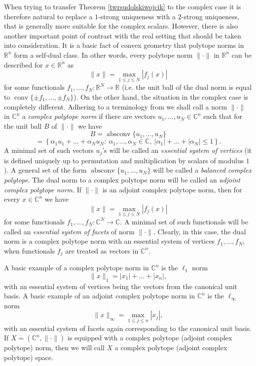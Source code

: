 \documentclass[12pt, reqno]{amsart}
\theoremstyle{definition}
\theoremstyle{remark}
\numberwithin{equation}{section}
\DeclareMathOperator{\conv}{conv}
\DeclareMathOperator{\absconv}{absconv}
\begin{document}
When trying to transfer Theorem \ref{twrsudolskiwojcik} to the complex case it is therefore natural to replace a $1$-strong uniqueness with a $2$-strong uniqueness, that is generally more suitable for the complex scalars. However, there is also another important point of contrast with the real setting that should be taken into consideration. It is a basic fact of convex geometry that polytope norms in $\mathbb{R}^n$ form a self-dual class. In other words, every polytope norm $\| \cdot \|$ in $\mathbb{R}^n$ can be described for $x \in \mathbb{R}^n$ as
$$\|x\| = \max_{1 \leq j \leq N} |f_j(x)|$$
for some functionals $f_1, \ldots, f_N: \mathbb{R}^N \to \mathbb{R}$ (i.e. the unit ball of the dual norm is equal to $\conv \{\pm f_1, \ldots, \pm f_N \}$). On the other hand, the situation in the complex case is completely different. Adhering to a terminology from \cite{complexpolytope} we shall call a norm $\| \cdot \|$ in $\mathbb{C}^n$ a \emph{complex polytope norm} if there are vectors $u_1, \ldots, u_N \in \mathbb{C}^n$ such that for the unit ball $B$ of $\| \cdot \|$ we have
$$B = \absconv \{u_1, \ldots, u_N\}$$
$$=\left \{ \alpha_1u_1 + \ldots +  \alpha_Nu_N: \ \alpha_1, \ldots, \alpha_N \in \mathbb{C}, \ |\alpha_1| + \ldots + |\alpha_N| \leq 1 \right \}.$$
A minimal set of such vectors $u_j$'s will be called an \emph{essential system of vertices} (it is defined uniquely up to permutation and multiplication by scalars of modulus $1$). A general set of the form $\absconv\{u_1, \ldots, u_N\}$ will be called a \emph{balanced complex polytope}. The dual norm to a complex polytope norm will be called an \emph{adjoint complex polytope norm}. If $\| \cdot \|$ is an adjoint complex polytope norm, then for every $x \in \mathbb{C}^n$ we have
$$\|x\| = \max_{1 \leq j \leq N} |f_j(x)|$$
for some functionals $f_1, \ldots, f_N: \mathbb{C}^N \to \mathbb{C}$. A minimal set of such functionals will be called an \emph{essential system of facets} of norm $\| \cdot \|$. Clearly, in this case, the dual norm is a complex polytope norm with an essential system of vertices $f_1, \ldots, f_N$, when functionals $f_j$ are treated as vectors in $\mathbb{C}^n$. 

A basic example of a complex polytope norm in $\mathbb{C}^n$ is the $\ell_1$ norm
$$\|x\|_1 = |x_1| + \ldots + |x_n|,$$
with an essential system of vertices being the vectors from the canonical unit basis. A basic example of an adjoint complex polytope norm in $\mathbb{C}^n$ is the $\ell_{\infty}$ norm
$$\|x\|_{\infty} = \max_{1 \leq j \leq n} |x_j|,$$
with an essential system of facets again corresponding to the canonical unit basis. If $X = (\mathbb{C}^n, \| \cdot \|)$ is equipped with a complex polytope (adjoint complex polytope) norm, then we will call $X$ a complex polytope (adjoint complex polytope) space.
\end{document}
